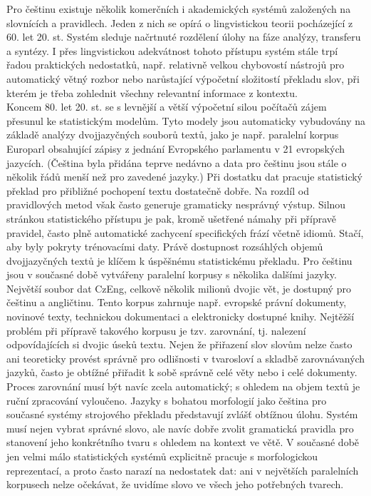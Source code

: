 \documentclass[]{../../metanetpaper}
\begin{document}
\begin{multicols}{2}
Pro češtinu existuje několik komerčních i akademických systémů založených na slovnících a pravidlech. Jeden z nich se opírá o lingvistickou teorii pocházející z 60. let 20. st. Systém sleduje načrtnuté rozdělení úlohy na fáze analýzy, transferu a syntézy. I přes lingvistickou adekvátnost tohoto přístupu systém stále trpí řadou praktických nedostatků, např. relativně velkou chybovostí nástrojů pro automatický větný rozbor nebo narůstající výpočetní složitostí překladu slov, při kterém je třeba zohlednit všechny relevantní informace z kontextu.\\
Koncem 80. let 20. st. se s levnější a větší výpočetní silou počítačů zájem přesunul ke statistickým modelům. Tyto modely jsou automaticky vybudovány na základě analýzy dvojjazyčných souborů textů, jako je např. paralelní korpus Europarl obsahující zápisy z jednání Evropského parlamentu v 21 evropských jazycích. (Čeština byla přidána teprve nedávno a data pro češtinu jsou stále o několik řádů menší než pro zavedené jazyky.) Při dostatku dat pracuje statistický překlad pro přibližné pochopení textu dostatečně dobře. Na rozdíl od pravidlových metod však často generuje gramaticky nesprávný výstup. Silnou stránkou statistického přístupu je pak, kromě ušetřené námahy při přípravě pravidel, často plně automatické zachycení specifických frází včetně idiomů. Stačí, aby byly pokryty trénovacími daty. Právě dostupnost rozsáhlých objemů dvojjazyčných textů je klíčem k úspěšnému statistickému překladu. Pro češtinu jsou v současné době vytvářeny paralelní korpusy s několika dalšími jazyky. Největší soubor dat CzEng\cite{Note20}, celkově několik milionů dvojic vět, je dostupný pro češtinu a angličtinu. Tento korpus zahrnuje např. evropské právní dokumenty, novinové texty, technickou dokumentaci a elektronicky dostupné knihy. Nejtěžší problém při přípravě takového korpusu je tzv. zarovnání, tj. nalezení odpovídajících si dvojic úseků textu. Nejen že přiřazení slov slovům nelze často ani teoreticky provést správně pro odlišnosti v tvarosloví a skladbě zarovnávaných jazyků, často je obtížné přiřadit k sobě správně celé věty nebo i celé dokumenty. Proces zarovnání musí být navíc zcela automatický; s ohledem na objem textů je ruční zpracování vyloučeno. Jazyky s bohatou morfologií jako čeština pro současné systémy strojového překladu představují zvlášť obtížnou úlohu. Systém musí nejen vybrat správné slovo, ale navíc dobře zvolit gramatická pravidla pro stanovení jeho konkrétního tvaru s ohledem na kontext ve větě. V současné době jen velmi málo statistických systémů explicitně pracuje s morfologickou reprezentací, a proto často narazí na nedostatek dat: ani v největších paralelních korpusech nelze očekávat, že uvidíme slovo ve všech jeho potřebných tvarech.


\end{multicols}
\end{document}
